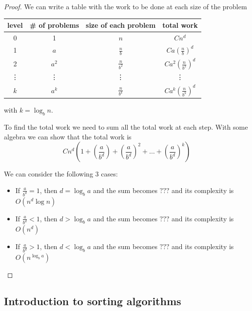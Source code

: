 \documentclass[10pt]{extarticle}
\begin{document}
\begin{proof}
    We can write a table with the work to be done at each size of the problem

    \begin{center}
        \begin{tabular}{ |c|c|c|c| }
            \hline
            level  & \# of problems & size of each problem & total work                         \\
            \hline
            0      & 1              & $n$                  & $Cn^d$                             \\
            1      & $a$            & $\frac{n}{b}$        & $Ca\left(\frac{n}{b}\right)^d$     \\
            2      & $a^2$          & $\frac{n}{b^2}$      & $Ca^2\left(\frac{n}{b^2}\right)^d$ \\
            \vdots & \vdots         & \vdots               & \vdots                             \\
            $k$    & $a^k$          & $\frac{n}{b^k}$      & $Ca^k\left(\frac{n}{b^k}\right)^d$ \\
            \hline
        \end{tabular}
    \end{center}

    with $k = \log_b n$.

    To find the total work we need to sum all the total work at each step.
    With some algebra we can show that the total work is
    $$
        Cn^d\left(1+\left(\frac{a}{b^d}\right)+\left(\frac{a}{b^d}\right)^2+\dots+\left(\frac{a}{b^d}\right)^k\right)
    $$

    We can consider the following 3 cases:
    \begin{itemize}
        \item If $\frac{a}{b^d} = 1$, then $d = \log_b a$ and the sum becomes $ ??? $ and its complexity is $O(n^d \log n)$
        \item If $\frac{a}{b^d} < 1$, then $d > \log_b a$ and the sum becomes $ ??? $ and its complexity is $O(n^d)$
        \item If $\frac{a}{b^d} > 1$, then $d < \log_b a$ and the sum becomes $ ??? $ and its complexity is $O(n^{\log_b a})$
    \end{itemize}

\end{proof}

\subsection{Introduction to sorting algorithms}
\end{document}
